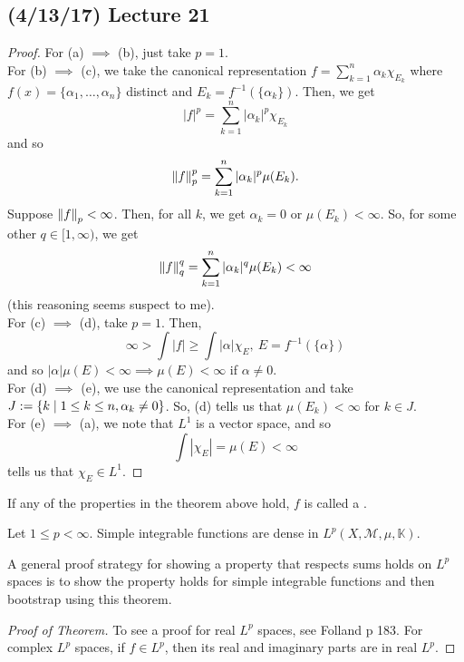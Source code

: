 \documentclass[11pt,leqno,oneside]{amsbook}
\numberwithin{thm}{section}
\newcommand{\M}{\mathcal{M}}
\newcommand{\K}{\mathbb{K}} %
\begin{document}
\subsection*{(4/13/17) Lecture 21}
\begin{proof}
  For (a) \(\implies\) (b), just take \(p=1\).\\

  For (b) \(\implies\) (c), we take the canonical representation \(f =
  \sum_{k=1}^n \alpha_k \chi_{E_k}\) where \(f(x) = \{\alpha_1,
  \ldots, \alpha_n\}\) distinct and \(E_k =
  f^{-1}(\{\alpha_k\})\). Then, we get \[
    |f|^p = \sum_{k=1}^n |\alpha_k|^p \chi_{E_k}
  \]
  and so \[
    \norm[f]_p^p = \sum_{k=1}^n |\alpha_k|^p \mu(E_k).
  \]
  Suppose \(\norm[f]_p < \infty\). Then, for all \(k\), we get
  \(\alpha_k = 0\) or \(\mu(E_k) < \infty\). So, for some other \(q
  \in [1,\infty)\), we get \[
    \norm[f]_q^q = \sum_{k=1}^n |\alpha_k|^q \mu(E_k) < \infty
  \]
  (this reasoning seems suspect to me). \\

  For (c) \(\implies\) (d), take \(p=1\). Then, \[
    \infty > \int |f| \geq \int |\alpha| \chi_E, \ E = f^{-1}(\{\alpha\})
  \]
  and so \(|\alpha|\mu(E) < \infty \implies \mu(E) < \infty\) if
  \(\alpha \neq 0\). \\

  For (d) \(\implies\) (e), we use the canonical representation and
  take \(J := \{k \st 1 \leq k \leq n, \alpha_k \neq 0\}\). So, (d)
  tells us that \(\mu(E_k) < \infty\) for \(k \in J\).\\

  For (e) \(\implies\) (a), we note that \(L^1\) is a vector space,
  and so \[
    \int |\chi_E| = \mu(E) < \infty
  \]
  tells us that \(\chi_E \in L^1\).
\end{proof}
\begin{defn}
  If any of the properties in the theorem above hold, \(f\) is called
  a . 
\end{defn}
\begin{thm}
  Let \(1 \leq p < \infty\). Simple integrable functions are dense in \(L^p(X,\M,\mu,\K)\).
\end{thm}
\begin{rmk}
  A general proof strategy for showing a property that respects sums
  holds on \(L^p\) spaces is to show the property holds for simple
  integrable functions and then bootstrap using this theorem.
\end{rmk}
\begin{proof}[Proof of Theorem]
  To see a proof for real \(L^p\) spaces, see Folland p 183. For
  complex \(L^p\) spaces, if \(f \in L^p\), then its real and
  imaginary parts are in real \(L^p\).
\end{proof}
\end{document}
